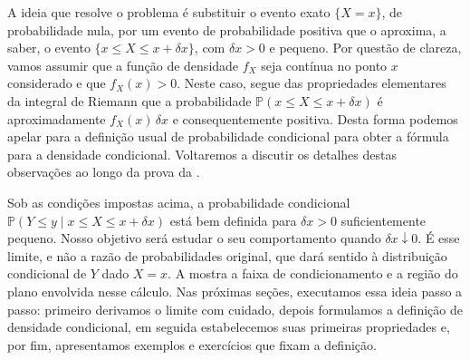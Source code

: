 \documentclass[12pt,portuguese]{article}
\theoremstyle{definition}
\theoremstyle{plainexercise}
\theoremstyle{starredexercise}
\theoremstyle{definition}
\begin{document}
\bigskip 

A ideia que resolve o problema é substituir o evento exato $\{X = x\}$, de probabilidade
nula, por um evento de probabilidade positiva que o aproxima, a saber, o evento
$\{x \leqslant X \leqslant x+\delta x\}$, com $\delta x > 0$ e pequeno. 
Por questão de clareza, vamos assumir que a função de densidade $f_X$
seja contínua no ponto $x$ considerado e que $f_X(x)>0$.
Neste caso, segue das propriedades elementares da integral de Riemann que a probabilidade
$\mathbb{P}(x \leqslant X \leqslant x+\delta x)$ é aproximadamente $f_X(x)\,\delta x$ e consequentemente
positiva. Desta forma podemos apelar para a definição usual de probabilidade condicional 
para obter a fórmula para a densidade condicional.
Voltaremos a discutir os detalhes destas observações ao longo da prova da . 

\bigskip 

Sob as condições impostas acima, a probabilidade condicional
$\mathbb{P}(Y \leqslant y \mid x \leqslant X \leqslant x+\delta x)$ está bem definida
para $\delta x > 0$ suficientemente pequeno. Nosso objetivo
será estudar o seu comportamento quando $\delta x \downarrow 0$. É esse limite, e não a razão de
probabilidades original, que dará sentido à distribuição condicional de $Y$ dado
$X = x$. A  mostra a faixa de condicionamento e a região
do plano envolvida nesse cálculo. Nas próximas seções, executamos essa ideia passo a
passo: primeiro derivamos o limite com cuidado, depois formulamos a definição de
densidade condicional, em seguida estabelecemos suas primeiras propriedades e, por fim,
apresentamos exemplos e exercícios que fixam a definição.
\end{document}
